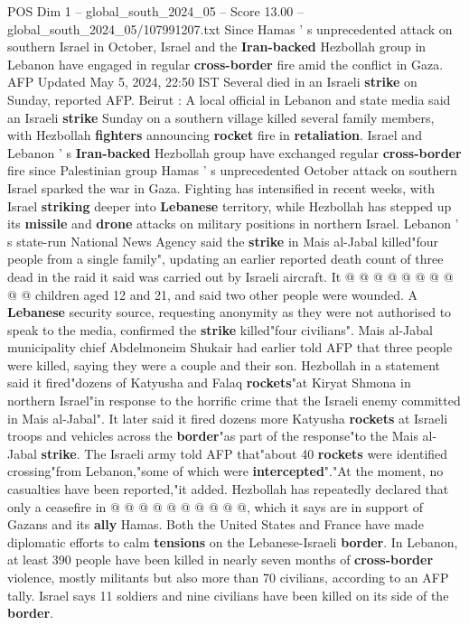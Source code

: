 \begin{textsample}{POS Dim 1 – global\_south\_2024\_05 – Score 13.00 – global\_south\_2024\_05/107991207.txt}  \label{ex:f1_pos_249}
Since Hamas ' s unprecedented attack on southern Israel in October, Israel and the \textbf{Iran-backed} Hezbollah group in Lebanon have engaged in regular \textbf{cross-border} fire amid the conflict in Gaza.
AFP Updated May 5, 2024, 22:50 IST Several died in an Israeli \textbf{strike} on Sunday, reported AFP.
Beirut : A local official in Lebanon and state media said an Israeli \textbf{strike} Sunday on a southern village killed several family members, with Hezbollah \textbf{fighters} announcing \textbf{rocket} fire in \textbf{retaliation}.
Israel and Lebanon ' s \textbf{Iran-backed} Hezbollah group have exchanged regular \textbf{cross-border} fire since Palestinian group Hamas ' s unprecedented October attack on southern Israel sparked the war in Gaza.
Fighting has intensified in recent weeks, with Israel \textbf{striking} deeper into \textbf{Lebanese} territory, while Hezbollah has stepped up its \textbf{missile} and \textbf{drone} attacks on military positions in northern Israel.
Lebanon ' s state-run National News Agency said the \textbf{strike} in Mais al-Jabal killed"four people from a single family", updating an earlier reported death count of three dead in the raid it said was carried out by Israeli aircraft.
It @ @ @ @ @ @ @ @ @ @ children aged 12 and 21, and said two other people were wounded.
A \textbf{Lebanese} security source, requesting anonymity as they were not authorised to speak to the media, confirmed the \textbf{strike} killed"four civilians".
Mais al-Jabal municipality chief Abdelmoneim Shukair had earlier told AFP that three people were killed, saying they were a couple and their son.
Hezbollah in a statement said it fired"dozens of Katyusha and Falaq \textbf{rockets}"at Kiryat Shmona in northern Israel"in response to the horrific crime that the Israeli enemy committed in Mais al-Jabal".
It later said it fired dozens more Katyusha \textbf{rockets} at Israeli troops and vehicles across the \textbf{border}"as part of the response"to the Mais al-Jabal \textbf{strike}.
The Israeli army told AFP that"about 40 \textbf{rockets} were identified crossing"from Lebanon,"some of which were \textbf{intercepted}"."At the moment, no casualties have been reported,"it added.
Hezbollah has repeatedly declared that only a ceasefire in @ @ @ @ @ @ @ @ @ @, which it says are in support of Gazans and its \textbf{ally} Hamas.
Both the United States and France have made diplomatic efforts to calm \textbf{tensions} on the Lebanese-Israeli \textbf{border}.
In Lebanon, at least 390 people have been killed in nearly seven months of \textbf{cross-border} violence, mostly militants but also more than 70 civilians, according to an AFP tally.
Israel says 11 soldiers and nine civilians have been killed on its side of the \textbf{border}.

\end{textsample}
